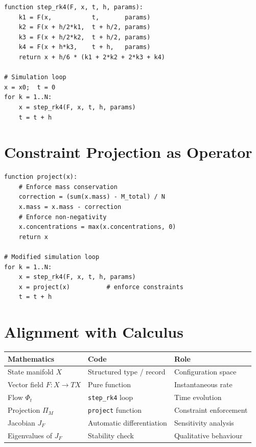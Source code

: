 \documentclass[12pt,openany]{book}
\newcommand{\proj}[1]{\Pi_{#1}}
\begin{document}
\begin{pseudocode}
\begin{lstlisting}
function step_rk4(F, x, t, h, params):
    k1 = F(x,           t,       params)
    k2 = F(x + h/2*k1,  t + h/2, params)
    k3 = F(x + h/2*k2,  t + h/2, params)
    k4 = F(x + h*k3,    t + h,   params)
    return x + h/6 * (k1 + 2*k2 + 2*k3 + k4)

# Simulation loop
x = x0;  t = 0
for k = 1..N:
    x = step_rk4(F, x, t, h, params)
    t = t + h
\end{lstlisting}
\end{pseudocode}

\section{Constraint Projection as Operator}

\begin{pseudocode}
\begin{lstlisting}
function project(x):
    # Enforce mass conservation
    correction = (sum(x.mass) - M_total) / N
    x.mass = x.mass - correction
    # Enforce non-negativity
    x.concentrations = max(x.concentrations, 0)
    return x

# Modified simulation loop
for k = 1..N:
    x = step_rk4(F, x, t, h, params)
    x = project(x)          # enforce constraints
    t = t + h
\end{lstlisting}
\end{pseudocode}

\section{Alignment with Calculus}

\begin{center}
\begin{tabular}{@{}lll@{}}
  \toprule
  \textbf{Mathematics} & \textbf{Code} & \textbf{Role} \\
  \midrule
  State manifold $X$ & Structured type / record & Configuration space \\
  Vector field $F:X\to TX$ & Pure function & Instantaneous rate \\
  Flow $\Phi_t$ & \texttt{step\_rk4} loop & Time evolution \\
  Projection $\proj{M}$ & \texttt{project} function & Constraint enforcement \\
  Jacobian $J_F$ & Automatic differentiation & Sensitivity analysis \\
  Eigenvalues of $J_F$ & Stability check & Qualitative behaviour \\
  \bottomrule
\end{tabular}
\end{center}
\end{document}
